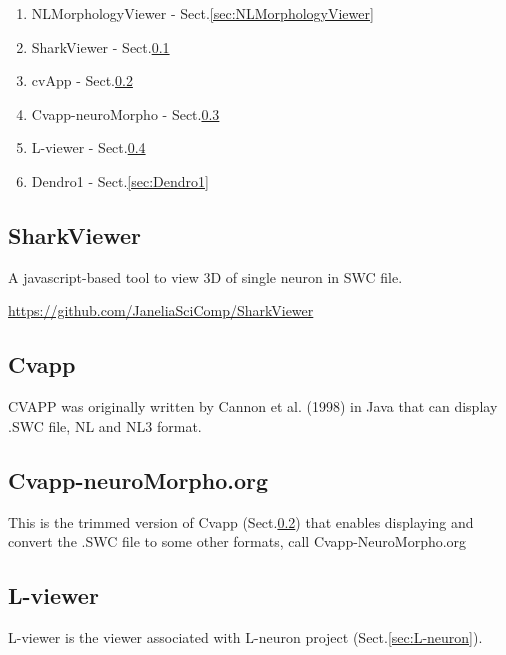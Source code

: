 \begin{enumerate}
  \item NLMorphologyViewer - Sect.\ref{sec:NLMorphologyViewer}

  \item SharkViewer - Sect.\ref{sec:SharkViewer}
  
  \item cvApp - Sect.\ref{sec:CVapp}
  
  \item Cvapp-neuroMorpho - Sect.\ref{sec:Cvapp-neuroMorpho}
  
  \item L-viewer - Sect.\ref{sec:L-viewer}
  
  \item Dendro1 - Sect.\ref{sec:Dendro1}
\end{enumerate}

\subsection{SharkViewer}
\label{sec:SharkViewer}

A javascript-based tool to view 3D of single neuron in SWC file.

\url{https://github.com/JaneliaSciComp/SharkViewer}

\subsection{Cvapp}
\label{sec:CVapp}

CVAPP was originally written by Cannon et al. (1998) in Java that can display
.SWC file, NL and NL3 format.


\subsection{Cvapp-neuroMorpho.org}
\label{sec:Cvapp-neuroMorpho}

This is the trimmed version of Cvapp (Sect.\ref{sec:CVapp}) that enables
displaying and convert the .SWC file to some other formats, call
Cvapp-NeuroMorpho.org



\subsection{L-viewer}
\label{sec:L-viewer}

L-viewer is the viewer associated with L-neuron project
(Sect.\ref{sec:L-neuron}).


